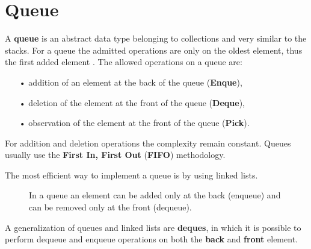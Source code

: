 \section{Queue}
\label{queue}
A \textbf{queue} is an abstract data type belonging to collections and very similar to the stacks. For a queue the admitted operations are only on the oldest element, thus the first added element \cite{wikiqueue}. The allowed operations on a queue are:
\begin{itemize}
\item[•] addition of an element at the back of the queue (\textbf{Enque}),
\item[•] deletion of the element at the front of the queue (\textbf{Deque}),
\item[•] observation of the element at the front of the queue (\textbf{Pick}).
\end{itemize}
For addition and deletion operations the complexity remain constant. Queues usually use the \textbf{First In, First Out} (\textbf{FIFO}) methodology. 

The most efficient way to implement a queue is by using linked lists.

\begin{figure}[H]
\centering
{}
\caption[Allowed operations on a queue.]{In a queue an element can be added only at the back (enqueue) and can be removed only at the front (dequeue).}
\label{queue_1}
\end{figure}

A generalization of queues and linked lists are \textbf{deques}, in which it is possible to perform dequeue and enqueue operations on both the \textbf{back} and \textbf{front} element.

